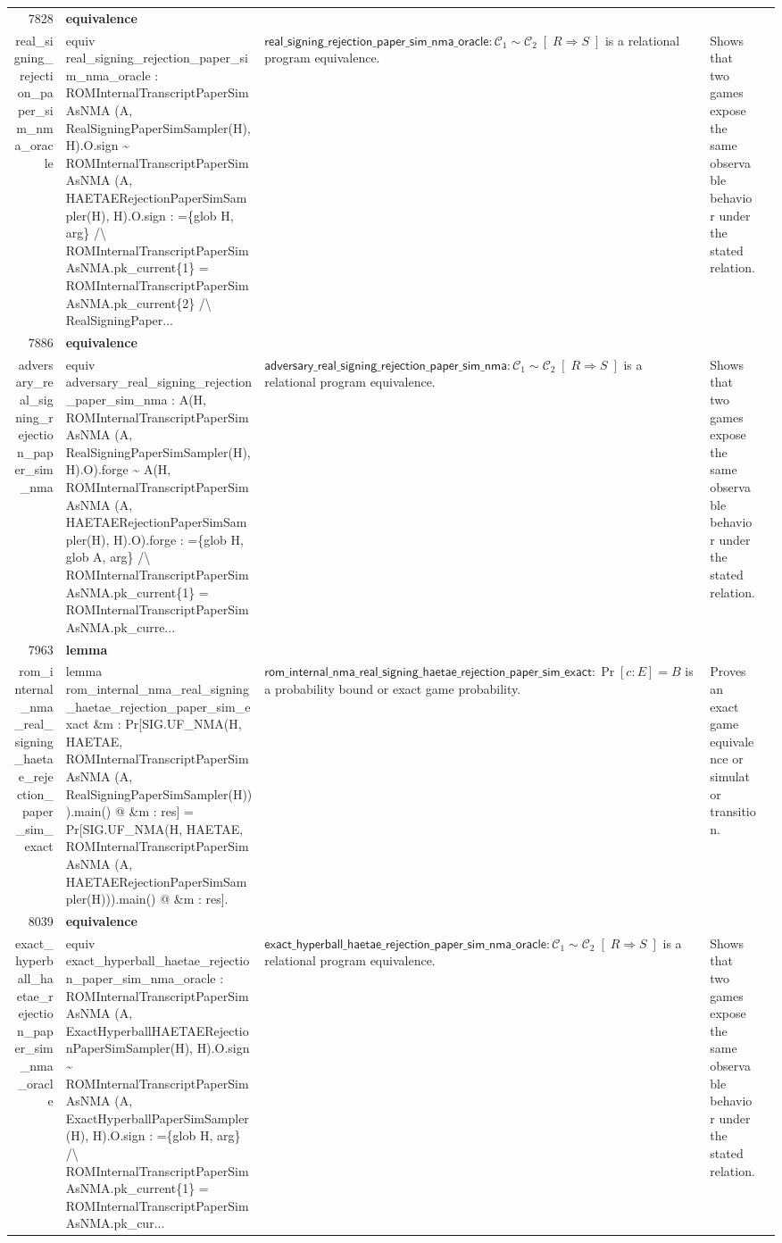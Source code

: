 \documentclass[10pt]{article}
\newcommand{\ec}[1]{\begingroup\ttfamily\scriptsize #1\endgroup}
\begin{document}
\begin{longtable}{r L{0.17\textwidth} L{0.26\textwidth} L{0.27\textwidth} L{0.20\textwidth}}
7828 & \textbf{equivalence}\\\ec{real\_signing\_rejection\_paper\_sim\_nma\_oracle} & \ec{equiv real\_signing\_rejection\_paper\_sim\_nma\_oracle : ROMInternalTranscriptPaperSimAsNMA (A, RealSigningPaperSimSampler(H), H).O.sign \textasciitilde{} ROMInternalTranscriptPaperSimAsNMA (A, HAETAERejectionPaperSimSampler(H), H).O.sign : =\{glob H, arg\} /\textbackslash{} ROMInternalTranscriptPaperSimAsNMA.pk\_current\{1\} = ROMInternalTranscriptPaperSimAsNMA.pk\_current\{2\} /\textbackslash{} RealSigningPaper...} & \(\mathsf{real\_signing\_rejection\_paper\_sim\_nma\_oracle} : \mathcal{C}_1 \sim \mathcal{C}_2 \;[\;R \Rightarrow S\;]\) is a relational program equivalence. & Shows that two games expose the same observable behavior under the stated relation. \\
7886 & \textbf{equivalence}\\\ec{adversary\_real\_signing\_rejection\_paper\_sim\_nma} & \ec{equiv adversary\_real\_signing\_rejection\_paper\_sim\_nma : A(H, ROMInternalTranscriptPaperSimAsNMA (A, RealSigningPaperSimSampler(H), H).O).forge \textasciitilde{} A(H, ROMInternalTranscriptPaperSimAsNMA (A, HAETAERejectionPaperSimSampler(H), H).O).forge : =\{glob H, glob A, arg\} /\textbackslash{} ROMInternalTranscriptPaperSimAsNMA.pk\_current\{1\} = ROMInternalTranscriptPaperSimAsNMA.pk\_curre...} & \(\mathsf{adversary\_real\_signing\_rejection\_paper\_sim\_nma} : \mathcal{C}_1 \sim \mathcal{C}_2 \;[\;R \Rightarrow S\;]\) is a relational program equivalence. & Shows that two games expose the same observable behavior under the stated relation. \\
7963 & \textbf{lemma}\\\ec{rom\_internal\_nma\_real\_signing\_haetae\_rejection\_paper\_sim\_exact} & \ec{lemma rom\_internal\_nma\_real\_signing\_haetae\_rejection\_paper\_sim\_exact \&m : Pr[SIG.UF\_NMA(H, HAETAE, ROMInternalTranscriptPaperSimAsNMA (A, RealSigningPaperSimSampler(H))).main() @ \&m : res] = Pr[SIG.UF\_NMA(H, HAETAE, ROMInternalTranscriptPaperSimAsNMA (A, HAETAERejectionPaperSimSampler(H))).main() @ \&m : res].} & \(\mathsf{rom\_internal\_nma\_real\_signing\_haetae\_rejection\_paper\_sim\_exact} : \Pr[c : E] = B\) is a probability bound or exact game probability. & Proves an exact game equivalence or simulator transition. \\
8039 & \textbf{equivalence}\\\ec{exact\_hyperball\_haetae\_rejection\_paper\_sim\_nma\_oracle} & \ec{equiv exact\_hyperball\_haetae\_rejection\_paper\_sim\_nma\_oracle : ROMInternalTranscriptPaperSimAsNMA (A, ExactHyperballHAETAERejectionPaperSimSampler(H), H).O.sign \textasciitilde{} ROMInternalTranscriptPaperSimAsNMA (A, ExactHyperballPaperSimSampler(H), H).O.sign : =\{glob H, arg\} /\textbackslash{} ROMInternalTranscriptPaperSimAsNMA.pk\_current\{1\} = ROMInternalTranscriptPaperSimAsNMA.pk\_cur...} & \(\mathsf{exact\_hyperball\_haetae\_rejection\_paper\_sim\_nma\_oracle} : \mathcal{C}_1 \sim \mathcal{C}_2 \;[\;R \Rightarrow S\;]\) is a relational program equivalence. & Shows that two games expose the same observable behavior under the stated relation. \\

\end{longtable}
\end{document}
